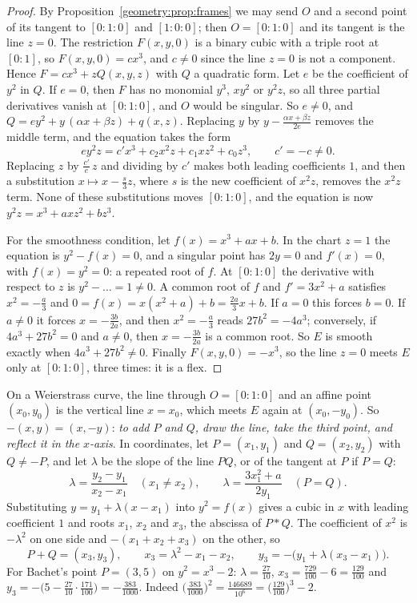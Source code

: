 \begin{proof}
By Proposition~\ref{geometry:prop:frames} we may send $O$ and a second point of its tangent to $[0:1:0]$ and $[1:0:0]$; then $O=[0:1:0]$ and its tangent is
the line $z=0$. The restriction $F(x,y,0)$ is a binary cubic with a triple root at $[0:1]$, so $F(x,y,0)=cx^3$, and $c\ne0$ since the line $z=0$
is not a component. Hence $F=cx^3+zQ(x,y,z)$ with $Q$ a quadratic form. Let $e$ be the coefficient of $y^2$ in $Q$. If $e=0$, then $F$ has no monomial
$y^3$, $xy^2$ or $y^2z$, so all three partial derivatives vanish at $[0:1:0]$, and $O$ would be singular. So $e\ne0$, and $Q=ey^2+y\,(\alpha x+\beta z)+q(x,z)$.
Replacing $y$ by $y-\frac{\alpha x+\beta z}{2e}$ removes the middle term, and the equation takes the form
\[
ey^2z=c'x^3+c_2x^2z+c_1xz^2+c_0z^3,\qquad c'=-c\ne0.
\]
Replacing $z$ by $\frac{c'}e\,z$ and dividing by $c'$ makes both leading coefficients $1$, and then a substitution $x\mapsto x-\frac s3z$, where $s$ is the
new coefficient of $x^2z$, removes the $x^2z$ term. None of these
substitutions moves $[0:1:0]$, and the equation is now $y^2z=x^3+axz^2+bz^3$.

For the smoothness condition, let $f(x)=x^3+ax+b$. In the chart $z=1$ the equation is $y^2-f(x)=0$, and a singular point has $2y=0$ and $f'(x)=0$, with
$f(x)=y^2=0$: a repeated root of $f$. At $[0:1:0]$ the derivative with respect to $z$ is $y^2-\dots=1\ne0$. A common root of $f$ and $f'=3x^2+a$ satisfies
$x^2=-\frac a3$ and $0=f(x)=x(x^2+a)+b=\frac{2a}3x+b$. If $a=0$ this forces $b=0$. If $a\ne0$ it forces $x=-\frac{3b}{2a}$, and then $x^2=-\frac a3$ reads
$27b^2=-4a^3$; conversely, if $4a^3+27b^2=0$ and $a\ne0$, then $x=-\frac{3b}{2a}$ is a common root. So $E$ is smooth exactly when $4a^3+27b^2\ne0$. Finally
$F(x,y,0)=-x^3$, so the line $z=0$ meets $E$ only at $[0:1:0]$, three times: it is a flex.
\end{proof}

On a Weierstrass curve, the line through $O=[0:1:0]$ and an affine point $(x_0,y_0)$ is the vertical line $x=x_0$, which meets $E$ again at $(x_0,-y_0)$.
So $-(x,y)=(x,-y)$: \emph{to add $P$ and $Q$, draw the line, take the third point, and reflect it in the $x$-axis}. In coordinates, let $P=(x_1,y_1)$ and
$Q=(x_2,y_2)$ with $Q\ne-P$, and let $\lambda$ be the slope of the line $PQ$, or of the tangent at $P$ if $P=Q$:
\[
\lambda=\frac{y_2-y_1}{x_2-x_1}\quad(x_1\ne x_2),\qquad\lambda=\frac{3x_1^2+a}{2y_1}\quad(P=Q).
\]
Substituting $y=y_1+\lambda(x-x_1)$ into $y^2=f(x)$ gives a cubic in $x$ with leading coefficient $1$ and roots $x_1$, $x_2$ and $x_3$, the abscissa of $P*Q$. The
coefficient of $x^2$ is $-\lambda^2$ on one side and $-(x_1+x_2+x_3)$ on the other, so
\[
P+Q=(x_3,y_3),\qquad x_3=\lambda^2-x_1-x_2,\qquad y_3=-\bigl(y_1+\lambda(x_3-x_1)\bigr).
\]
For Bachet's point $P=(3,5)$ on $y^2=x^3-2$: $\lambda=\frac{27}{10}$, $x_3=\frac{729}{100}-6=\frac{129}{100}$ and $y_3=-\bigl(5-\frac{27}{10}\cdot\frac{171}{100}\bigr)
=-\frac{383}{1000}$. Indeed $\bigl(\frac{383}{1000}\bigr)^2=\frac{146689}{10^6}=\bigl(\frac{129}{100}\bigr)^3-2$.

